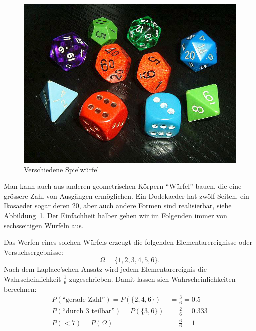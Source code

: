 \begin{figure}
\begin{center}
\includegraphics[width=0.8\hsize]{graphics/Wuerfel5}
\end{center}
\caption{Verschiedene Spielwürfel\label{bild-spielwuerfel}}
\end{figure}
Man kann auch aus anderen geometrischen Körpern ``Würfel'' bauen, die
eine grössere Zahl von Ausgängen ermöglichen.
Ein Dodekaeder hat
zwölf Seiten, ein Ikosaeder sogar deren 20, aber auch andere Formen
sind realisierbar, siehe Abbildung~\ref{bild-spielwuerfel}.
Der Einfachheit
halber gehen wir im Folgenden immer von sechsseitigen Würfeln aus.

Das Werfen eines solchen Würfels erzeugt die folgenden Elementarereignisse
oder Versuchsergebnisse:
\[
\Omega=\{1,2,3,4,5,6\}.
\]
Nach dem Laplace'schen Ansatz wird jedem Elementarereignis die
Wahrscheinlichkeit $\frac16$ zugeschrieben.
Damit lassen sich
Wahrscheinlichkeiten berechnen:
\begin{align*}
P(\text{``gerade Zahl''})=P(\{2,4,6\})&=\frac36=0.5\\
P(\text{``durch 3 teilbar''})=P(\{3,6\})&=\frac26=0.333\\
P(< 7)=P(\Omega)&=\frac66=1
\end{align*}

